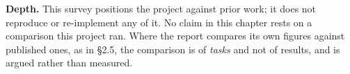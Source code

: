 \textbf{Depth.} This survey positions the project against prior work; it
does not reproduce or re-implement any of it. No claim in this chapter
rests on a comparison this project ran. Where the report compares its
own figures against published ones, as in \S{}2.5, the comparison is of
\emph{tasks} and not of results, and is argued rather than measured.
